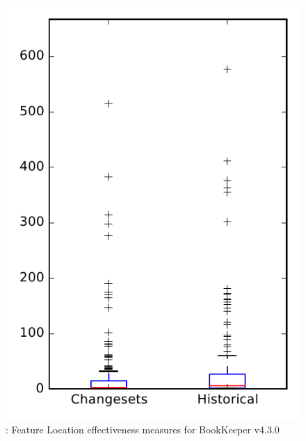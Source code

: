 
\begin{figure}
\centering
\includegraphics[height=0.4\textheight]{figures/flt/rq2_bookkeeper}
\caption{\ftwo: Feature Location effectiveness measures for BookKeeper v4.3.0}
\label{fig:flt:rq2:bookkeeper}
\end{figure}
